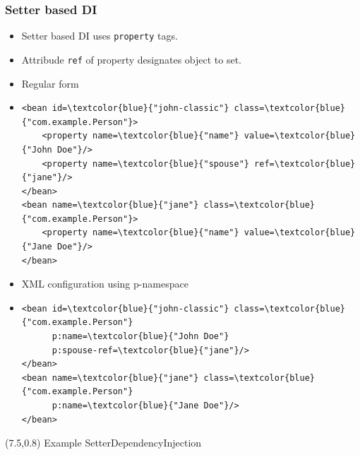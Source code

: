 \documentclass[10pt,xcolor=pdflatex, table]{beamer}
\begin{document}
\begin{frame}[fragile]\frametitle{Setter based DI}
	\begin{itemize}
		\item Setter based DI uses \texttt{property} tags.
		\item Attribude \texttt{ref} of property designates object to set.
		\item Regular form
        \item[]
            \begin{Verbatim}[fontsize=\footnotesize, commandchars=\\\{\}]
<bean id=\textcolor{blue}{"john-classic"} class=\textcolor{blue}{"com.example.Person"}>
    <property name=\textcolor{blue}{"name"} value=\textcolor{blue}{"John Doe"}/>
    <property name=\textcolor{blue}{"spouse"} ref=\textcolor{blue}{"jane"}/>
</bean>
<bean name=\textcolor{blue}{"jane"} class=\textcolor{blue}{"com.example.Person"}>
    <property name=\textcolor{blue}{"name"} value=\textcolor{blue}{"Jane Doe"}/>
</bean>
            \end{Verbatim}
		\item XML configuration using p-namespace
        \item[]
        	\medskip
            \begin{Verbatim}[fontsize=\footnotesize, commandchars=\\\{\}]
<bean id=\textcolor{blue}{"john-classic"} class=\textcolor{blue}{"com.example.Person"}
      p:name=\textcolor{blue}{"John Doe"}
      p:spouse-ref=\textcolor{blue}{"jane"}/>
</bean>
<bean name=\textcolor{blue}{"jane"} class=\textcolor{blue}{"com.example.Person"}
      p:name=\textcolor{blue}{"Jane Doe"}/>
</bean>
			\end{Verbatim}
	\end{itemize}
\begin{textblock}{15}(7.5,0.8)
    {\footnotesize Example SetterDependencyInjection}
\end{textblock}
\end{frame}
\end{document}
